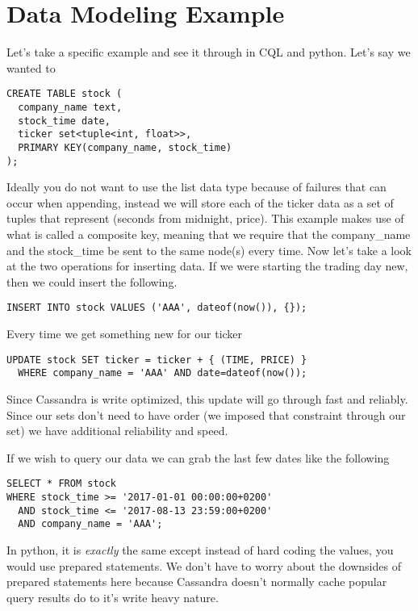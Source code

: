 \documentclass[9pt,twocolumn,twoside]{idsi}
\begin{document}
\section{Data Modeling Example}

Let's take a specific example and see it through in CQL and python. Let's say we wanted to 

\begin{lstlisting}[breaklines]
CREATE TABLE stock (
  company_name text,
  stock_time date,
  ticker set<tuple<int, float>>,
  PRIMARY KEY(company_name, stock_time)
);
\end{lstlisting}

Ideally you do not want to use the list data type because of failures that can occur when appending, instead we will store each of the ticker data as a set of tuples that represent (seconds from midnight, price). This example makes use of what is called a composite key, meaning that we require that the company\_name and the stock\_time be sent to the same node(s) every time. Now let's take a look at the two operations for inserting data. If we were starting the trading day new, then we could insert the following.

\begin{lstlisting}[breaklines]
INSERT INTO stock VALUES ('AAA', dateof(now()), {});
\end{lstlisting}

Every time we get something new for our ticker

\begin{lstlisting}[breaklines]
UPDATE stock SET ticker = ticker + { (TIME, PRICE) } 
  WHERE company_name = 'AAA' AND date=dateof(now());
\end{lstlisting}

Since Cassandra is write optimized, this update will go through fast and reliably. Since our sets don't need to have order (we imposed that constraint through our set) we have additional reliability and speed.

If we wish to query our data we can grab the last few dates like the following

\begin{lstlisting}[breaklines]
SELECT * FROM stock 
WHERE stock_time >= '2017-01-01 00:00:00+0200' 
  AND stock_time <= '2017-08-13 23:59:00+0200'
  AND company_name = 'AAA';
\end{lstlisting}

In python, it is \textit{exactly} the same except instead of hard coding the values, you would use prepared statements. We don't have to worry about the downsides of prepared statements here because Cassandra doesn't normally cache popular query results do to it's write heavy nature.
\end{document}
